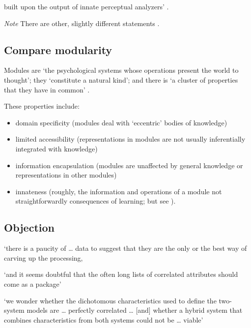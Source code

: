 \documentclass[12pt]{extarticle}
\begin{document}
\begin{multicols}{3}
              
built upon the output of innate perceptual analyzers’ 
\citep[p.\ 520]{Carey:1996hl}.
 
\textit{Note} There are other, slightly different statements \citep[e.g.][]{carey:2009_origin}.
 
\subsection{Compare modularity}
 
Modules are ‘the psychological systems whose operations present the world to thought’; 
    they ‘constitute a natural kind’; and 
    there is ‘a cluster of properties that they have in common’ \citep[p.\ 101]{Fodor:1983dg}.
 
These properties include:
 
\begin{itemize}
 
\item domain specificity (modules deal with ‘eccentric’ bodies of knowledge)
 
\item limited accessibility (representations in modules are not usually inferentially integrated with knowledge)
 
\item information encapsulation (modules are unaffected by general knowledge or representations in other modules)
 
\item innateness (roughly, the information and operations of a module not straightforwardly consequences of learning; but see \citet{Samuels:2004ho}).
 
\end{itemize}
 
\subsection{Objection}
 
‘there is a paucity of … data to suggest that they are the only or the best way of carving up the processing,
 
‘and it seems doubtful that the often long lists of correlated attributes should come as a package’
\citep[p.\ 759]{adolphs_conceptual_2010}
 
‘we wonder whether the dichotomous characteristics used to define the two-system models are … perfectly correlated …
[and] whether a hybrid system that combines characteristics from both systems could not be … viable’
\citep[p.\ 537]{keren_two_2009}
 

\end{multicols}
\end{document}
